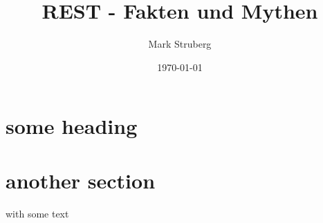 \documentclass[12pt,a4paper]{article}
\title{REST - Fakten und Mythen}
\author{Mark Struberg}
\date{\today}
\begin{document}
\maketitle
\tableofcontents
    
\section{some heading}

\section{another section}
with some text

\printbibliography
\end{document}
